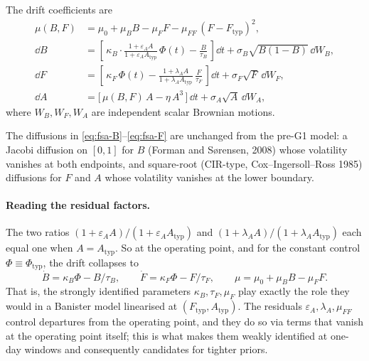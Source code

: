 The drift coefficients are
\begin{align}
  \mu(B,F) &= \mu_0 + \mu_B B - \mu_F F - \mu_{FF}\,(F - F_{\mathrm{typ}})^2,
            \label{eq:fsa-mu} \\
  \dd B &= \left[\,\kappa_B \cdot \frac{1+\varepsilon_A A}{1+\varepsilon_A A_{\mathrm{typ}}}\,\Phi(t)
                  - \frac{B}{\tau_B}\,\right]\dd t
            + \sigma_B \sqrt{B(1-B)}\,\dd W_B, \label{eq:fsa-B} \\
  \dd F &= \left[\,\kappa_F\,\Phi(t)
                  - \frac{1+\lambda_A A}{1+\lambda_A A_{\mathrm{typ}}}\,
                    \frac{F}{\tau_F}\,\right]\dd t
            + \sigma_F \sqrt{F}\,\dd W_F, \label{eq:fsa-F} \\
  \dd A &= \bigl[\,\mu(B,F)\,A - \eta\,A^3\,\bigr]\,\dd t
            + \sigma_A \sqrt{A}\,\dd W_A, \label{eq:fsa-A}
\end{align}
where $W_B,W_F,W_A$ are independent scalar Brownian motions.

The diffusions in \eqref{eq:fsa-B}--\eqref{eq:fsa-F} are unchanged from
the pre-G1 model: a Jacobi diffusion on $[0,1]$ for $B$ (Forman and
S\o rensen, 2008) whose volatility vanishes at both endpoints, and
square-root (CIR-type, Cox--Ingersoll--Ross 1985) diffusions for $F$ and
$A$ whose volatility vanishes at the lower boundary.

\paragraph{Reading the residual factors.} The two ratios
$(1+\varepsilon_A A)/(1+\varepsilon_A A_{\mathrm{typ}})$ and
$(1+\lambda_A A)/(1+\lambda_A A_{\mathrm{typ}})$ each equal one when
$A=A_{\mathrm{typ}}$. So at the operating point, and for the constant
control $\Phi \equiv \Phi_{\mathrm{typ}}$, the drift collapses to
\begin{equation}
  \dot B = \kappa_B \Phi - B/\tau_B,
  \qquad
  \dot F = \kappa_F \Phi - F/\tau_F,
  \qquad
  \mu = \mu_0 + \mu_B B - \mu_F F.
  \label{eq:fsa-collapse}
\end{equation}
That is, the strongly identified parameters $\kappa_B, \tau_F, \mu_F$
play exactly the role they would in a Banister model linearised at
$(F_{\mathrm{typ}}, A_{\mathrm{typ}})$. The residuals
$\varepsilon_A, \lambda_A, \mu_{FF}$ control departures from the
operating point, and they do so via terms that vanish at the operating
point itself; this is what makes them weakly identified at one-day
windows and consequently candidates for tighter priors.


